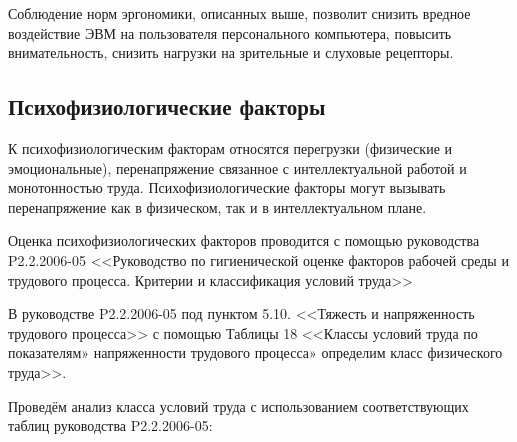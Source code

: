 Соблюдение норм эргономики, описанных выше, позволит снизить вред\-ное воздействие ЭВМ на пользователя персонального компьютера, повысить вни\-мательность, снизить наг\-рузки на зрительные и слуховые рецепторы.

\subsection{Психофизиологические факторы}

К психофизиологическим факторам относятся перегрузки (физические и эмоциональ\-ные), перенапряжение связанное с интеллектуальной работой и монотонностью труда. Психофи\-зиологические факторы могут вызывать перенапряжение как в физическом, так и в интел\-лектуальном плане.

Оценка психофизиологических факторов проводится с помощью руковод\-ства P2.2.2006-05 <<Руководство по гигиенической оценке факторов рабочей среды и трудового процесса. Критерии и классификация условий труда>>

В руководстве P2.2.2006-05 под пунктом 5.10. <<Тяжесть и напряженность трудового процесса>> с помощью Таблицы 18 <<Классы условий труда по по\-казателям» напряженности трудового процесса» определим класс физичес\-кого труда>>.

Проведём анализ класса условий труда с использованием соответству\-ющих таблиц руководства P2.2.2006-05:

